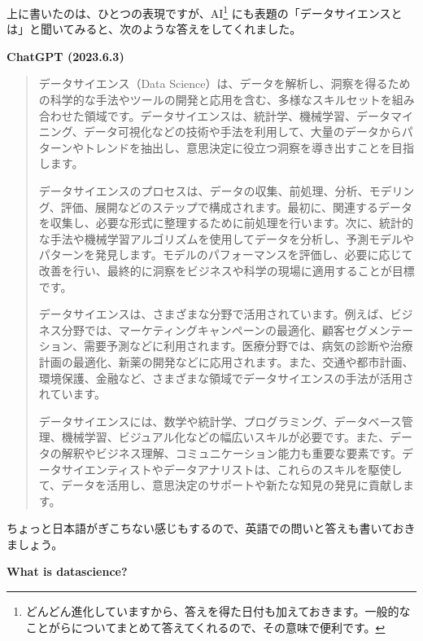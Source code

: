 \documentclass[
  xelatex, ja=standard]{bxjsbook}
\theoremstyle{definition}
\theoremstyle{definition}
\theoremstyle{definition}
\theoremstyle{definition}
\theoremstyle{remark}
\begin{document}
上に書いたのは、ひとつの表現ですが、AI\footnote{どんどん進化していますから、答えを得た日付も加えておきます。一般的なことがらについてまとめて答えてくれるので、その意味で便利です。} にも表題の「データサイエンスとは」と聞いてみると、次のような答えをしてくれました。

\textbf{ChatGPT (2023.6.3)}

\begin{quote}
データサイエンス（Data Science）は、データを解析し、洞察を得るための科学的な手法やツールの開発と応用を含む、多様なスキルセットを組み合わせた領域です。データサイエンスは、統計学、機械学習、データマイニング、データ可視化などの技術や手法を利用して、大量のデータからパターンやトレンドを抽出し、意思決定に役立つ洞察を導き出すことを目指します。

データサイエンスのプロセスは、データの収集、前処理、分析、モデリング、評価、展開などのステップで構成されます。最初に、関連するデータを収集し、必要な形式に整理するために前処理を行います。次に、統計的な手法や機械学習アルゴリズムを使用してデータを分析し、予測モデルやパターンを発見します。モデルのパフォーマンスを評価し、必要に応じて改善を行い、最終的に洞察をビジネスや科学の現場に適用することが目標です。

データサイエンスは、さまざまな分野で活用されています。例えば、ビジネス分野では、マーケティングキャンペーンの最適化、顧客セグメンテーション、需要予測などに利用されます。医療分野では、病気の診断や治療計画の最適化、新薬の開発などに応用されます。また、交通や都市計画、環境保護、金融など、さまざまな領域でデータサイエンスの手法が活用されています。

データサイエンスには、数学や統計学、プログラミング、データベース管理、機械学習、ビジュアル化などの幅広いスキルが必要です。また、データの解釈やビジネス理解、コミュニケーション能力も重要な要素です。データサイエンティストやデータアナリストは、これらのスキルを駆使して、データを活用し、意思決定のサポートや新たな知見の発見に貢献します。
\end{quote}

ちょっと日本語がぎこちない感じもするので、英語での問いと答えも書いておきましょう。

\textbf{What is datascience?}
\end{document}
